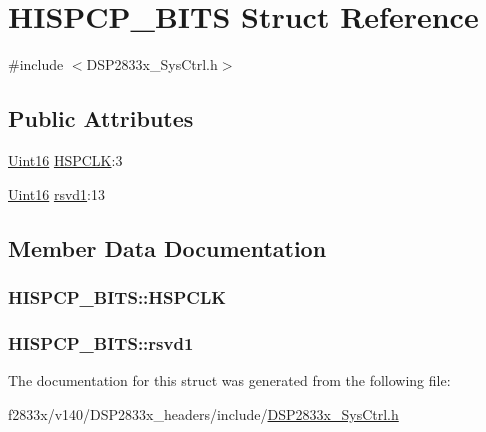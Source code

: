 \hypertarget{struct_h_i_s_p_c_p___b_i_t_s}{}\section{H\+I\+S\+P\+C\+P\+\_\+\+B\+I\+T\+S Struct Reference}
\label{struct_h_i_s_p_c_p___b_i_t_s}


{\ttfamily \#include $<$D\+S\+P2833x\+\_\+\+Sys\+Ctrl.\+h$>$}

\subsection*{Public Attributes}
\begin{DoxyCompactItemize}
\item 
\hyperlink{_d_s_p2833x___device_8h_a59a9f6be4562c327cbfb4f7e8e18f08b}{Uint16} \hyperlink{struct_h_i_s_p_c_p___b_i_t_s_a889af4f1cf80c60b7abf27da02f28933}{H\+S\+P\+C\+L\+K}\+:3
\item 
\hyperlink{_d_s_p2833x___device_8h_a59a9f6be4562c327cbfb4f7e8e18f08b}{Uint16} \hyperlink{struct_h_i_s_p_c_p___b_i_t_s_a2fe7f5779cca36d001b3d6e5a6357285}{rsvd1}\+:13
\end{DoxyCompactItemize}


\subsection{Member Data Documentation}
\hypertarget{struct_h_i_s_p_c_p___b_i_t_s_a889af4f1cf80c60b7abf27da02f28933}{}
\subsubsection[{H\+S\+P\+C\+L\+K}]{ H\+I\+S\+P\+C\+P\+\_\+\+B\+I\+T\+S\+::\+H\+S\+P\+C\+L\+K}\label{struct_h_i_s_p_c_p___b_i_t_s_a889af4f1cf80c60b7abf27da02f28933}
\hypertarget{struct_h_i_s_p_c_p___b_i_t_s_a2fe7f5779cca36d001b3d6e5a6357285}{}
\subsubsection[{rsvd1}]{ H\+I\+S\+P\+C\+P\+\_\+\+B\+I\+T\+S\+::rsvd1}\label{struct_h_i_s_p_c_p___b_i_t_s_a2fe7f5779cca36d001b3d6e5a6357285}


The documentation for this struct was generated from the following file\+:\begin{DoxyCompactItemize}
\item 
f2833x/v140/\+D\+S\+P2833x\+\_\+headers/include/\hyperlink{_d_s_p2833x___sys_ctrl_8h}{D\+S\+P2833x\+\_\+\+Sys\+Ctrl.\+h}\end{DoxyCompactItemize}
